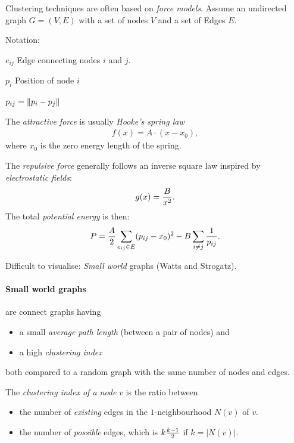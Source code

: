 Clustering techniques are often based on \emph{force models}. Assume an undirected graph $G=(V,E)$ with a set of nodes $V$ and a set of Edges $E$.

Notation:
\begin{description}
    \item $e_{ij}$ Edge connecting nodes $i$ and $j$.
    \item $p_i$ Position of node $i$
    \item $p_{ij} = \left\lVert p_i-p_j\right\rVert$ 
\end{description}


The \emph{attractive force} is usually \emph{Hooke's spring law}
\begin{align*}
 f(x) = A\cdot(x-x_0),
\end{align*}
where $x_0$ is the zero energy length of the spring.

The \emph{repulsive force} generally follows an inverse square law inspired by \emph{electrostatic fields}:
\begin{align*}
    g(x) = {B\over x^2}.
\end{align*}
The total \emph{potential energy} is then:
\begin{align*}
    P = {A \over 2} \sum_{e_{ij} \in E} (p_{ij} - x_0)^2 - B\sum_{i\neq j} {1\over p_{ij}}.
\end{align*}

Difficult to visualise: \emph{Small world} graphs (Watts and Strogatz).

\paragraph{Small world graphs} are connect graphs having
\begin{itemize}
\item a small \emph{average path length} (between a pair of nodes) and
\item a high \emph{clustering index}
\end{itemize}
both compared to a random graph with the same number of nodes and edges.

The \emph{clustering index of a node} $v$ is the ratio between
\begin{itemize}
\item the number of \emph{existing} edges in the $1$-neighbourhood $N(v)$ of $v$.
\item the number of \emph{possible} edges, which is $k{k-1\over 2}$ if $k=|N(v)|$.
\end{itemize}

